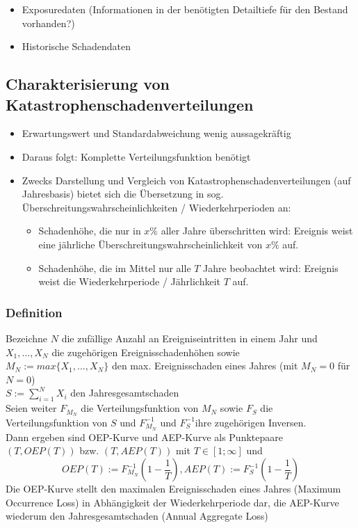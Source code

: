 \documentclass[12pt]{report}
\theoremstyle{dotless}
\theoremstyle{definition}
\begin{document}
\begin{itemize}
\item Exposuredaten (Informationen in der benötigten Detailtiefe für den Bestand vorhanden?)
\item Historische Schadendaten
\end{itemize}

\subsection{Charakterisierung von Katastrophenschadenverteilungen}

\begin{itemize}
\item Erwartungswert und Standardabweichung wenig aussagekräftig
\item Daraus folgt: Komplette Verteilungsfunktion benötigt
\item Zwecks Darstellung und Vergleich von Katastrophenschadenverteilungen (auf Jahresbasis) bietet sich die Übersetzung in sog. Überschreitungswahrscheinlichkeiten / Wiederkehrperioden an:
\begin{itemize}
\item Schadenhöhe, die nur in $x\%$ aller Jahre überschritten wird: Ereignis weist eine jährliche Überschreitungswahrscheinlichkeit von $x\%$ auf.
\item Schadenhöhe, die im Mittel nur alle $T$ Jahre beobachtet wird: Ereignis weist die Wiederkehrperiode / Jährlichkeit $T$ auf.
\end{itemize}
\end{itemize}

\subsubsection{Definition}
Bezeichne $N$ die zufällige Anzahl an Ereigniseintritten in einem Jahr und $X_1, ..., X_N$ die zugehörigen Ereignisschadenhöhen sowie\\
$M_N:= max{\{ X_1, ..., X_N\}}$ den max. Ereignisschaden eines Jahres (mit $M_N=0$ für $N=0$)\\
$S:= \sum^N_{i=1} X_i$ den Jahresgesamtschaden \\
Seien weiter $F_{M_N}$ die Verteilungsfunktion von $M_N$ sowie $F_S$ die Verteilungsfunktion von $S$ und $F^{-1}_{M_N}$ und $F^{-1}_S$ihre zugehörigen Inversen. \\
Dann ergeben sind OEP-Kurve und AEP-Kurve als Punktepaare $(T, OEP(T))$ bzw. $(T, AEP(T))$ mit $T \in [1;\infty ]$ und
\begin{equation}
OEP(T) := F^{-1}_{M_N} \left( 1- \frac{1}{T} \right) , AEP(T):= F^{-1}_S \left( 1- \frac{1}{T} \right)
\end{equation}
Die OEP-Kurve stellt den maximalen Ereignisschaden eines Jahres (Maximum Occurrence Loss) in
Abhängigkeit der Wiederkehrperiode dar, die AEP-Kurve wiederum den Jahresgesamtschaden (Annual
Aggregate Loss) \\
\end{document}

